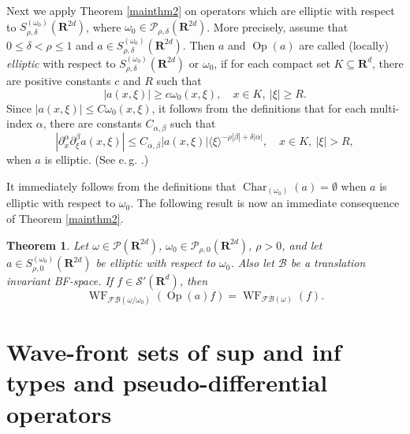 \documentclass[12pt,a4paper,reqno]{amsart}
\numberwithin{equation}{section}
\newtheorem{thm}{Theorem}
\numberwithin{thm}{section}
\theoremstyle{definition}
\theoremstyle{remark}
\begin{document}
\medspace

Next we apply Theorem \ref{mainthm2} on
operators which are elliptic with respect to $S^{(\omega _0)}_{\rho
,\delta}({\mathbf R^{{2d}}})$, where $\omega _0\in \mathscr P_{\rho,\delta}({\mathbf R^{{2d}}})$. More
precisely, assume that $0\le \delta <\rho \le1$ and $a\in S^{(\omega
_0)}_{\rho ,\delta}({\mathbf R^{{2d}}})$. Then $a$ and
${\operatorname{Op}} (a)$ are called (locally) \emph{elliptic} with respect to
$S^{(\omega _0)}_{\rho ,\delta}({\mathbf R^{{2d}}})$ or $\omega _0$,
if for each compact set $K\subseteq {\mathbf R^{d}}$, there are positive
constants $c$ and $R$ such that
$$
|a(x,\xi )| \ge c\omega _0(x,\xi ),\quad x\in K,\ |\xi |\ge R.
$$
Since $|a(x,\xi )|\le C\omega _0(x,\xi )$, it follows from the
definitions that for each multi-index $\alpha$, there are constants
$C_{\alpha,\beta}$ such that
\begin{equation*}
|\partial ^\alpha _x\partial ^\beta _\xi a(x,\xi )| \le C_{\alpha
,\beta}|a(x,\xi )|{\langle \xi\rangle} ^{-\rho |\beta |+\delta |\alpha |},\quad
x\in K,\   |\xi |>R,
\end{equation*}
when $a$ is elliptic. (See e.{\,}g. \cite {Ho1,BBR}.) 

\par

It immediately follows from the
definitions that ${\operatorname{Char}} _{(\omega _0)}(a)=\emptyset$ when $a$ is
elliptic with respect to $\omega _0$. The following result is now an
immediate consequence of Theorem \ref{mainthm2}.

\par

\begin{thm}\label{hypoellthm}
Let $\omega \in \mathscr P({\mathbf R^{{2d}}})$, $\omega _0\in \mathscr P_{\rho ,0}({\mathbf R^{{2d}}})$, $\rho >0$, and
let $a\in S^{(\omega _0)} _{\rho ,0} ({\mathbf R^{{2d}}})$ be elliptic with respect to $\omega _0$. Also let $\mathscr B$
be a translation invariant BF-space.
If $f\in \mathscr S'({\mathbf R^{d}})$, then
$$
{\operatorname{WF}} _{{\mathscr F\! \mathscr B} (\omega /\omega _0)} ({\operatorname{Op}} (a)f)= {\operatorname{WF}} _{{\mathscr F\! \mathscr B} (\omega )} (f).
$$
\end{thm}

\par

\section{Wave-front sets of sup and inf types and
pseudo-differential operators}\label{sec5}
\end{document}
